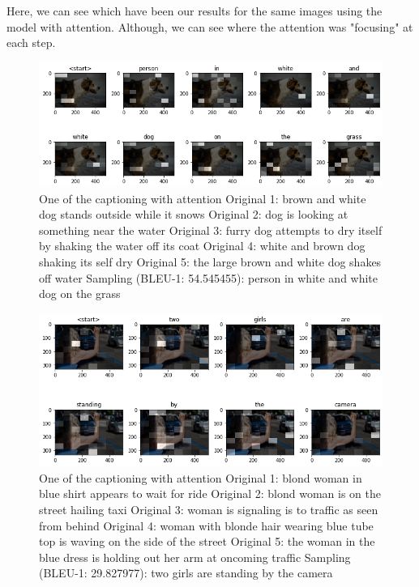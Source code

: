 \documentclass{article} %
\begin{document}
Here, we can see which have been our results for the same images using the model with attention. Although, we can see where the attention was "focusing" at each step. 

\begin{figure}[ht]
\centering
\includegraphics[scale=0.5]{attentiondog.png}
\caption{One of the captioning with attention\newline
Original 1: brown and white dog stands outside while it snows\newline
Original 2: dog is looking at something near the water\newline
Original 3: furry dog attempts to dry itself by shaking the water off its coat\newline
Original 4: white and brown dog shaking its self dry\newline
Original 5: the large brown and white dog shakes off water\newline
Sampling (BLEU-1: 54.545455): person in white and white dog on the grass\newline}
\label{attdog}
\end{figure}

\begin{figure}[ht]
\centering
\includegraphics[scale=0.5]{attentionwoman.png}
\caption{One of the captioning with attention\newline
Original 1: blond woman in blue shirt appears to wait for ride\newline
Original 2: blond woman is on the street hailing taxi\newline
Original 3: woman is signaling is to traffic as seen from behind\newline
Original 4: woman with blonde hair wearing blue tube top is waving on the side of the street\newline
Original 5: the woman in the blue dress is holding out her arm at oncoming traffic\newline
Sampling (BLEU-1: 29.827977): two girls are standing by the camera\newline}
\label{attwomanstreet}
\end{figure}
\end{document}
